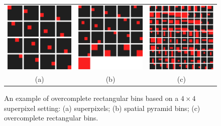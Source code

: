\begin{figure}
  \centering
  \begin{tabular}{ccc}
    \includegraphics[width=0.27\linewidth]{figs/smartpooling/basebins.png} & %
    \includegraphics[width=0.27\linewidth]{figs/smartpooling/spmbins.png} & %
    \includegraphics[width=0.27\linewidth]{figs/smartpooling/ocbins.png}\\
    (a) & (b) & (c)
  \end{tabular}
  \caption{An example of overcomplete rectangular bins based on a $4\times 4$ superpixel setting: (a) superpixels; (b) spatial pyramid bins; (c) overcomplete rectangular bins.}\label{fig:ocbins} 
\end{figure}

